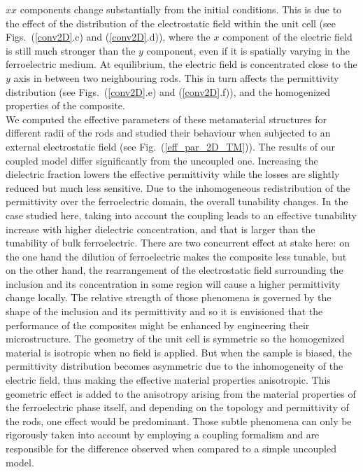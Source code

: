 \documentclass[openacc]{rsproca_new}%
\newcommand{\fig}[1]{Fig.~(\ref{#1})}
\begin{document}
 $xx$ components change substantially from the initial conditions.
 This is due to the effect of the distribution
 of the electrostatic field within the unit cell (see Figs.~(\ref{conv2D}.c) and (\ref{conv2D}.d)),
 where the $x$ component of the electric field is still much stronger
 than the $y$ component, even if it is spatially varying in the ferroelectric medium.
 At equilibrium, the electric field is concentrated close to the $y$ axis in between two neighbouring
 rods. This in turn affects the permittivity distribution (see Figs.~(\ref{conv2D}.e) and (\ref{conv2D}.f)),
 and the homogenized properties of the composite.\\
 We computed the effective parameters of these metamaterial structures for different
 radii of the rods and studied their behaviour when subjected to an external
 electrostatic field (see \fig{eff_par_2D_TM}). The results of our coupled
 model differ significantly from the uncoupled one. Increasing the dielectric fraction
 lowers the effective permittivity while the losses are slightly reduced but much less sensitive.
 Due to the inhomogeneous redistribution of the permittivity over the ferroelectric domain, the
 overall tunability changes. In the case studied here, taking into account the coupling leads to an effective tunability increase with
 higher dielectric concentration, and that is larger than the tunability of bulk ferroelectric.  There are two concurrent effect at stake here: on the one hand
 the dilution of ferroelectric makes the composite less tunable, but on the other hand,
 the rearrangement of the electrostatic field surrounding the inclusion and its
 concentration in some region will cause a higher permittivity change locally.
 The relative strength of those phenomena is governed by the shape of the inclusion and its permittivity
 and so it is envisioned that the performance of the composites might be enhanced by engineering
 their microstructure.
 The geometry of the unit cell is symmetric so the homogenized material is
  isotropic when no field is applied.
 But when the sample is biased, the permittivity distribution becomes asymmetric due
 to the inhomogeneity of the electric field, thus making the effective material properties anisotropic.
This geometric effect is added to the anisotropy arising from the material properties of the ferroelectric
phase itself, and depending on the topology and permittivity of the rods, one effect would be predominant.
Those subtle phenomena can only be rigorously taken into account by employing a coupling formalism
and are responsible for the difference observed when compared to a simple uncoupled model.\\
\end{document}
